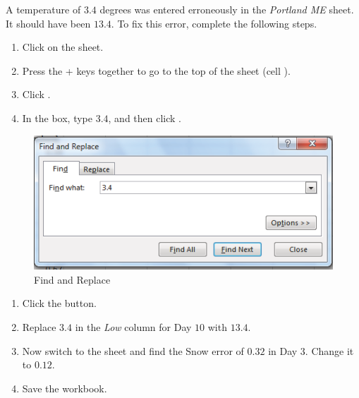 A temperature of $ 3.4 $ degrees was entered erroneously in the \textit{Portland ME} sheet. It should have been $ 13.4 $. To fix this error, complete the following steps.

\begin{enumerate}
	\item Click on the  sheet.
	\item Press the + keys together to go to the top of the sheet (cell ).
	\item Click .
	\item In the  box, type $ 3.4 $, and then click .
\end{enumerate}

\begin{figure}[H]
	\centering
	\includegraphics[width=\maxwidth{.95\linewidth}]{gfx/ch05_fig06}
	\caption{Find and Replace}
	\label{05:fig06}
\end{figure}

\begin{enumerate}
	\item Click the  button.
	\item Replace $ 3.4 $ in the \textit{Low} column for Day $ 10 $ with $ 13.4 $.
	\item Now switch to the  sheet and find the Snow error of $ 0.32 $ in Day $ 3 $. Change it to $ 0.12 $. 
	\item Save the  workbook.
\end{enumerate}

